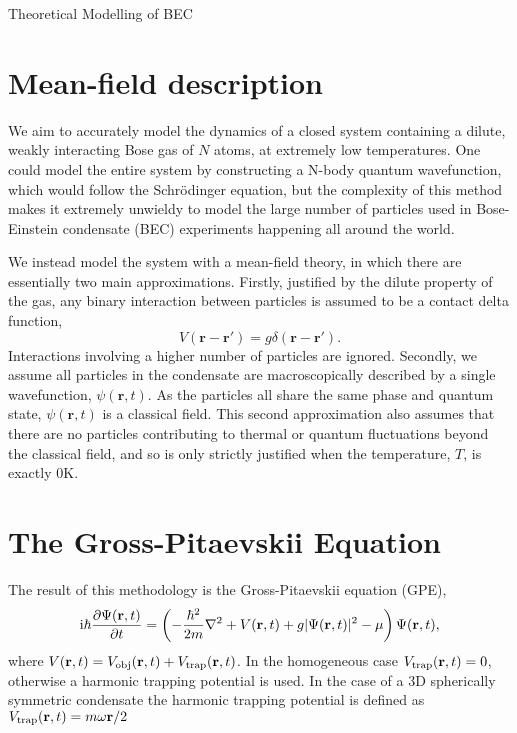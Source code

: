 \begin{chapter}{\label{cha:theoretical_model}Theoretical Modelling of BEC}
\section{\label{section:meanfield} Mean-field description}
We aim to accurately model the dynamics of a closed system containing a dilute, weakly interacting Bose gas of $N$ atoms, at extremely low temperatures. One could model the entire system by constructing a N-body quantum wavefunction, which would follow the Schr\"odinger equation, but the complexity of this method makes it extremely unwieldy to model the large number of particles used in Bose-Einstein condensate (BEC) experiments happening all around the world.

We instead model the system with a mean-field theory, in which there are essentially two main approximations. Firstly, justified by the dilute property of the gas, any binary interaction between particles is assumed to be a contact delta function,
\begin{equation*}
V(\mathbf{r}-\mathbf{r}') = g \delta(\mathbf{r}-\mathbf{r}').
\end{equation*}
Interactions involving a higher number of particles are ignored. Secondly, we assume all particles in the condensate are macroscopically described by a single wavefunction, $\psi(\mathbf{r},t)$. As the particles all share the same phase and quantum state, $\psi(\mathbf{r},t)$ is a classical field. This second approximation also assumes that there are no particles contributing to thermal or quantum fluctuations beyond the classical field, and so is only strictly justified when the temperature, $T$, is exactly $0\mathrm{K}$.

\section{\label{section:gpe} The Gross-Pitaevskii Equation}
The result of this methodology is the Gross-Pitaevskii equation (GPE), 
\begin{equation}
\mathrm{i} \hbar \frac{\partial\Psi({\bf r},t)}{\partial t} = \left(-\frac{\hbar^2}{2m}\nabla^2 + V({\bf r},t) + g|\Psi({\bf r},t)|^2 - \mu \right) \Psi({\bf r},t),
\label{eq:gpe}
\end{equation}
where $V({\bf r},t) = V_{\mathrm{obj}}({\bf r},t) + V_{\mathrm{trap}}({\bf r},t)$. In the homogeneous case $V_{\mathrm{trap}}({\bf r},t)=0$, otherwise a harmonic trapping potential is used. In the case of a 3D spherically symmetric condensate the harmonic trapping potential is defined as $V_{\mathrm{trap}}({\bf r},t)=m\omega{\bf r}/2$


\end{chapter}
